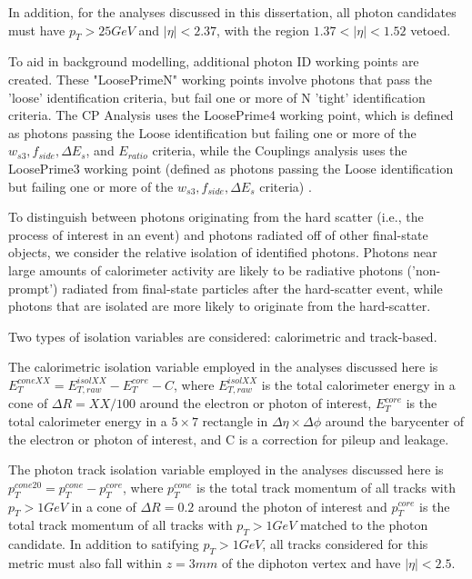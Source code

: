 In addition, for the analyses discussed in this dissertation, all photon candidates must have $p_{T} > 25 GeV$ and $|\eta| < 2.37$, with the region $1.37 < |\eta| < 1.52$ vetoed. 

To aid in background modelling, additional photon ID working points are created. These "LoosePrimeN" working points involve photons that pass the 'loose' identification criteria, but fail one or more of N 'tight' identification criteria. The CP Analysis uses the LoosePrime4 working point, which is defined as photons passing the Loose identification but failing one or more of the $w_{s3}, f_{side}, \Delta E_{s}$, and $E_{ratio}$ criteria, while the Couplings analysis uses the LoosePrime3 working point (defined as photons passing the Loose identification but failing one or more of the $w_{s3}, f_{side}, \Delta E_{s}$ criteria) \cite{CERN-EP-2019-145}.

To distinguish between photons originating from the hard scatter (i.e., the process of interest in an event) and photons radiated off of other final-state objects, we consider the relative isolation of identified photons. Photons near large amounts of calorimeter activity are likely to be radiative photons ('non-prompt') radiated from final-state particles after the hard-scatter event, while photons that are isolated are more likely to originate from the hard-scatter.

Two types of isolation variables are considered: calorimetric and track-based.

The calorimetric isolation variable employed in the analyses discussed here is $E_{T}^{coneXX} = E_{T,raw}^{isolXX} -E_{T}^{core} - C$, where $E_{T,raw}^{isolXX}$ is the total calorimeter energy in a cone of $\Delta R = XX/100 $ around the electron or photon of interest, $E_{T}^{core}$ is the total calorimeter energy in a $5 \times 7$ rectangle in $\Delta \eta \times \Delta \phi$ around the barycenter of the electron or photon of interest, and C is a correction for pileup and leakage.

The photon track isolation variable employed in the analyses discussed here is $p_{T}^{cone20} = p_{T}^{cone} - p_{T}^{core}$, where $p_{T}^{cone}$ is the total track momentum of all tracks with $p_{T} > 1GeV$ in a cone of $\Delta R = 0.2$ around the photon of interest and $p_{T}^{core}$ is the total track momentum of all tracks with $p_{T} > 1GeV$ matched to the photon candidate. In addition to satifying $p_{T} > 1GeV$, all tracks considered for this metric must also fall within $z= 3mm$ of the diphoton vertex and have $|\eta|<2.5$.

